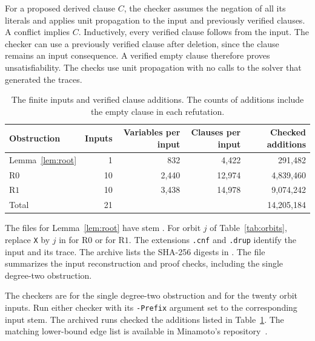\documentclass[11pt,reqno]{amsart}
\numberwithin{equation}{section}
\begin{document}
For a proposed derived clause \(C\), the checker assumes the
negation of all its literals and applies unit propagation to the
input and previously verified clauses. A conflict implies \(C\).
Inductively, every verified clause follows from the input. The
checker can use a previously verified clause after deletion, since
the clause remains an input consequence. A verified empty clause
therefore proves unsatisfiability. The checks use unit propagation
with no calls to the solver that generated the traces.

\begin{table}[htbp]
\centering
\small
\begin{tabular}{@{}lrrrr@{}}
\toprule
Obstruction & Inputs & Variables per input & Clauses per input &
Checked additions\\
\midrule
Lemma~\ref{lem:root} & 1 & 832 & 4{,}422 & 291{,}482\\
\(\mathrm{R0}\) & 10 & 2{,}440 & 12{,}974 & 4{,}839{,}460\\
\(\mathrm{R1}\) & 10 & 3{,}438 & 14{,}978 & 9{,}074{,}242\\
\midrule
Total & 21 & & & 14{,}205{,}184\\
\bottomrule
\end{tabular}
\caption{The finite inputs and verified clause additions. The counts
of additions include the empty clause in each refutation.}
\label{tab:checks}
\end{table}

The files for Lemma~\ref{lem:root} have stem
. For orbit \(j\) of
Table~\ref{tab:orbits}, replace \texttt{X} by \(j\) in
 for \(\mathrm{R0}\)
or  for \(\mathrm{R1}\).
The extensions \texttt{.cnf} and \texttt{.drup} identify the input
and its trace. The archive lists the SHA-256 digests in
.
The file  summarizes the input
reconstruction and proof checks, including the single degree-two
obstruction.

The checkers are
 for the single degree-two obstruction and
 for the twenty orbit inputs.
Run either checker with its \texttt{-Prefix} argument set to the
corresponding input stem. The archived runs checked the additions
listed in Table~\ref{tab:checks}. The matching lower-bound edge list
is available in Minamoto's repository~\cite{minamotodata}.
\end{document}
